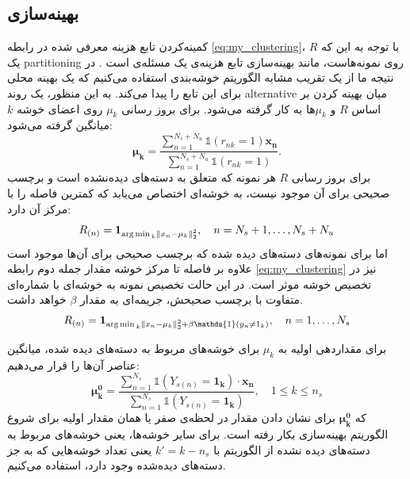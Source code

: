 \subsection{بهینه‌سازی}\label{simple_opt}
 کمینه‌کردن تابع هزینه معرفی شده در رابطه
\eqref{eq:my_clustering}،
با توجه به این که $R$ یک \gls{partitioning} روی نمونه‌هاست، مانند بهینه‌سازی تابع هزینه‌ی  یک مسئله‌ی \nphard است \cite{kmeans_nphard}. در نتیجه ما از یک تقریب
مشابه الگوریتم خوشه‌بندی  استفاده می‌کنیم که یک بهینه محلی برای این تابع را پیدا می‌کند. به این منظور،  یک روند \gls{alternative}  میان بهینه کردن بر اساس $R$ و $\mu_k$ها به کار گرفته می‌شود. برای بروز رسانی $\mu_k$ روی اعضای خوشه $k$ میانگین گرفته می‌شود:
\begin{equation} \label{eq:updata_mu}
 \boldsymbol{\mu_k} = \frac{\sum_{n=1}^{N_s + N_u}  \mathds{1}(r_{nk}=1)\mathbf{x_n}}{\sum_{n=1}^{N_s+N_u}\mathds{1}(r_{nk}=1)}.
\end{equation}
برای بروز رسانی $R$ هر نمونه که متعلق به دسته‌های دیده‌نشده است و برچسب صحیحی برای آن موجود نیست، به خوشه‌ای اختصاص می‌یابد که کمترین فاصله را با مرکز آن دارد:
\begin{equation} \label{eq:updata_R}
R_{(n)} = \mathbf{1}_{\operatorname*{arg\,min\,}_k \left \lVert x_n - \mu_k \right \rVert_2^2}, \quad n=N_s+1,\ldots,N_s+N_u
\end{equation}
اما برای نمونه‌های دسته‌های دیده شده که برچسب صحیحی برای آن‌ها موجود است علاوه بر فاصله تا مرکز خوشه مقدار جمله دوم رابطه \eqref{eq:my_clustering} نیز در تخصیص خوشه موثر است. در این حالت تخصیص نمونه به خوشه‌ای با شماره‌ای متفاوت با برچسب صحیحش، جریمه‌ای به مقدار $\beta$ خواهد داشت.
\begin{align}\label{eq:updata_R2}
R_{(n)} = \mathbf{1}_{\argmin_k \normtwo{x_n - \mu_k} + \beta \mathds{1}(y_n \neq 1_k)}, \quad n=1,\ldots,N_s
\end{align}

برای مقداردهی اولیه به $\mu_k$ برای  خوشه‌های مربوط به دسته‌های دیده شده، میانگین عناصر آن‌ها را قرار می‌دهیم:
\begin{equation} \label{eq:init_mu}
 \boldsymbol{\mu_k^0} = \frac{\sum_{n=1}^{N_s}  \mathds{1}(Y_{s(n)} = \mathbf{1_k})\cdot \mathbf{x_n}}{\sum_{n=1}^{N_s}\mathds{1}(Y_{s(n)} = \mathbf{1_k})},
\quad 1 \leq k \leq n_s
\end{equation}
که $\boldsymbol{\mu_k^0} $ برای نشان دادن مقدار در لحظه‌ی صفر یا همان مقدار اولیه برای شروع الگوریتم بهینه‌سازی بکار رفته است.
برای سایر خوشه‌ها، یعنی خوشه‌های مربوط به دسته‌های دیده نشده از الگوریتم
 \cite{kmeanspp}
با $k' = k- n_s$ یعنی تعداد خوشه‌هایی که به جز دسته‌های دیده‌شده وجود دارد،
استفاده می‌کنیم.


